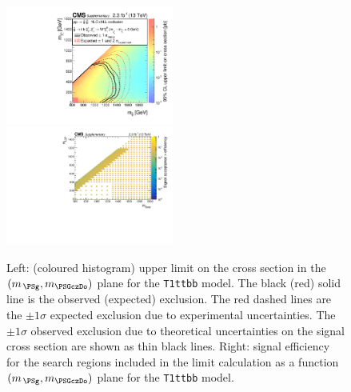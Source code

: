 \begin{figure}[t]
  \begin{center}
    \includegraphics[width=0.49\textwidth]{RA1T1ttbbXSEC_aux} \, 
    \includegraphics[width=0.49\textwidth]{T1ttbb_merging_4_cats_aux} \,     
  \end{center}
  \caption{Left: (coloured histogram) upper limit on the cross section in the $(m_{\,\PSg}, m_{\PSGczDo})$ plane for the \texttt{T1ttbb} model. 
  The black (red) solid line is the observed (expected) exclusion. The red dashed lines are the $\pm1\sigma$ expected exclusion due to experimental uncertainties. 
  The $\pm1\sigma$ observed exclusion due to theoretical uncertainties on the signal cross section are shown as thin black lines. 
  Right: signal efficiency for the search regions included in the limit calculation as a function $(m_{\,\PSg}, m_{\PSGczDo})$ plane for the \texttt{T1ttbb} model. 
  \label{fig:T1ttbb_excl}}
\end{figure}


